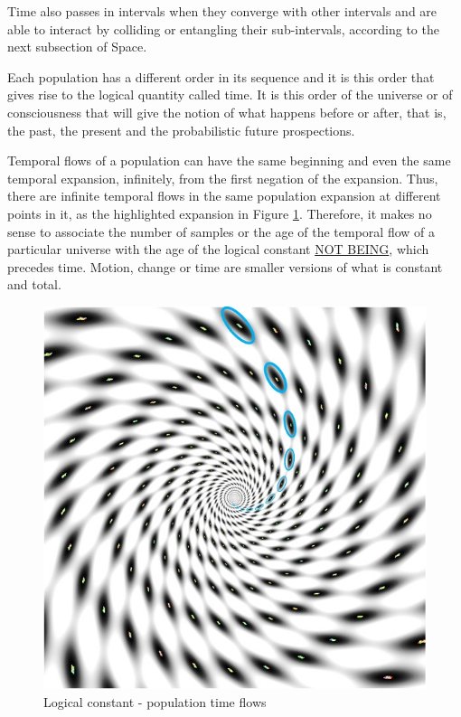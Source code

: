 Time also passes in intervals when they converge with other intervals and are able to interact by colliding or entangling their sub-intervals, according to the next subsection of Space.

Each population has a different order in its sequence and it is this order that gives rise to the logical quantity called time. It is this order of the universe or of consciousness that will give the notion of what happens before or after, that is, the past, the present and the probabilistic future prospections.

Temporal flows of a population can have the same beginning and even the same temporal expansion, infinitely, from the first negation of the expansion. Thus, there are infinite temporal flows in the same population expansion at different points in it, as the highlighted expansion in Figure \ref{fig:consciousness_constant_time}. Therefore, it makes no sense to associate the number of samples or the age of the temporal flow of a particular universe with the age of the logical constant \underline{NOT BEING}, which precedes time. Motion, change or time are smaller versions of what is constant and total.
	\begin{figure}[H]
	\caption{Logical constant - population time flows}
	\label{fig:consciousness_constant_time}
	\centering
	\includegraphics[scale=.6]{sections/images/consciousness_constant_time.jpg}
	\end{figure}

